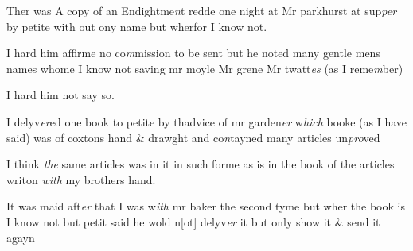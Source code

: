 \documentclass[12pt, a4paper]{book}
\begin{document}
				\marginpar[\vspace{0.5cm}{\textcolor{Gray}{16}}]{}
			
         	
		\ifthenelse{\isodd{\thepage}}
		{\reversemarginpar}
		{\normalmarginpar}
		Ther was A copy of an Endightme\textit{n}t redde one night at Mr parkhurst
at sup\textit{per} by petite with out ony name but wherfor I know not.
         	
				\marginpar[\vspace{0.5cm}{\textcolor{Gray}{17.18.}}]{}
			
         		
		\ifthenelse{\isodd{\thepage}}
		{\reversemarginpar}
		{\normalmarginpar}
		I hard him affirme no co\textit{m}mission to be sent but he noted many
gentle mens names whome I know not saving mr moyle Mr grene
Mr twatt\textit{es} (as I reme\textit{m}ber)
         	
				\marginpar[\vspace{0.5cm}{\textcolor{Gray}{19.20.}}]{}
			
         			
		\ifthenelse{\isodd{\thepage}}
		{\reversemarginpar}
		{\normalmarginpar}
		I hard him not say so. 
         	
				\marginpar[\vspace{0.5cm}{\textcolor{Gray}{21}}]{}
			
         	
		\ifthenelse{\isodd{\thepage}}
		{\reversemarginpar}
		{\normalmarginpar}
		I delyv\textit{er}ed one book to petite by thadvice of mr garden\textit{er} w\textit{hich} booke
(as I have said) was of coxtons hand \& drawght and co\textit{n}tayned
many articles un\textit{pro}ved
         	
				\marginpar[\vspace{0.5cm}{\textcolor{Gray}{22}}]{}
			
         	
		\ifthenelse{\isodd{\thepage}}
		{\reversemarginpar}
		{\normalmarginpar}
		 I think \textit{the} same articles was in it in such forme as is in the 
book of the articles writon \textit{with} my brothers hand.
         	
				\marginpar[\vspace{0.5cm}{\textcolor{Gray}{23}}]{}
			
         	
		\ifthenelse{\isodd{\thepage}}
		{\reversemarginpar}
		{\normalmarginpar}
		It was maid aft\textit{er} that I was w\textit{ith} mr baker the second tyme
but wher the book is I know not but petit said he wold n[ot]
delyv\textit{er} it but only show it \& send it agayn
         	
				\marginpar[\vspace{0.5cm}{\textcolor{Gray}{24}}]{}
			
\end{document}
